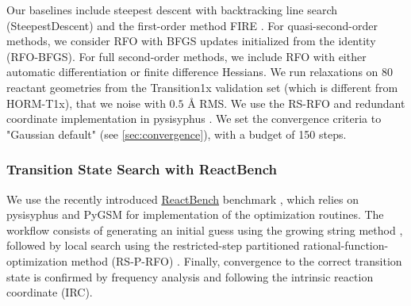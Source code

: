 \documentclass[pdflatex,sn-mathphys-num]{sn-jnl}%
\theoremstyle{thmstyleone}%
\theoremstyle{thmstyletwo}%
\theoremstyle{thmstylethree}%
\begin{document}
\begin{appendices}
Our baselines include steepest descent with backtracking line search (SteepestDescent) and the first-order method FIRE \citep{bitzek2006}. For quasi-second-order methods, we consider RFO with BFGS updates initialized from the identity (RFO-BFGS). For full second-order methods, we include RFO with either automatic differentiation or finite difference Hessians. 
%
We run relaxations on 80 reactant geometries from the Transition1x validation set (which is different from HORM-T1x), that we noise with $0.5$ \AA{} RMS. We use the RS-RFO and redundant coordinate implementation in pysisyphus \citep{steinmetzer2021, herbolComputationalImplementationNudged2017}. We set the convergence criteria to "Gaussian default" (see \ref{sec:convergence}), with a budget of 150 steps.

\subsubsection{Transition State Search with ReactBench\label{sec:reactbench}}
We use the recently introduced \href{https://github.com/deepprinciple/ReactBench}{ReactBench} benchmark \citep{zhao2025}, which relies on pysisyphus \citep{steinmetzer2021} and PyGSM\cite{aldazZimmermanGroupPyGSM2025} for implementation of the optimization routines.
The workflow consists of generating an initial guess using the growing string method \citep{aldazZimmermanGroupPyGSM2025, zimmerman2015}, followed by local search using the restricted-step partitioned rational-function-optimization method (RS-P-RFO) \citep{RSRFO1998a}. Finally, convergence to the correct transition state is confirmed by frequency analysis and following the intrinsic reaction coordinate (IRC).


\end{appendices}
\end{document}
